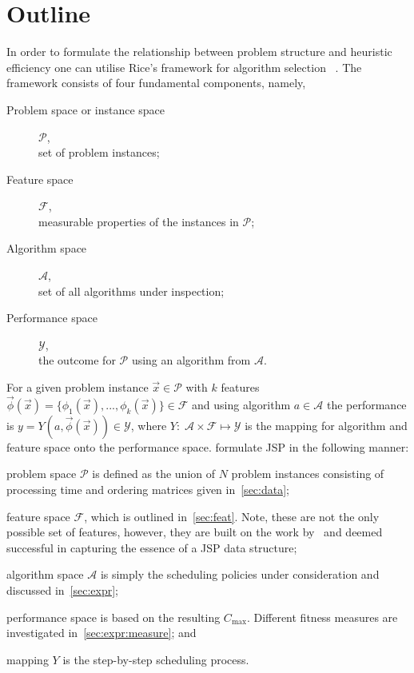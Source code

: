\documentclass{acm_proc_article-sp}
\begin{document}
\section{Outline}
In order to formulate the relationship between problem structure and heuristic efficiency one can utilise Rice's framework for algorithm selection ~\cite{Rice76}. The framework consists of four fundamental components, namely,
\begin{description}
  \item[Problem space or instance space] $\mathcal{P}$, \hfill\\
  set of problem instances; 
  \item[Feature space] $\mathcal{F}$, \hfill\\
  measurable properties of the instances in $\mathcal{P}$;
  \item[Algorithm space] $\mathcal{A}$, \hfill\\
  set of all algorithms under inspection;
  \item[Performance space] $\mathcal{Y}$, \hfill\\
  the outcome for $\mathcal{P}$ using an algorithm from $\mathcal{A}$.
\end{description}
For a given problem instance $\vec{x}\in\mathcal{P}$ with $k$ features $\vec{\phi}(\vec{x})=\{\phi_1(\vec{x}),...,\phi_k( \vec{x})\}\in\mathcal{F}$ and using algorithm $a\in\mathcal{A}$ the performance is $y=Y(a,\vec{\phi}(\vec{x}))\in\mathcal{Y}$, where $Y:\;\mathcal{A}\times\mathcal{F} \mapsto \mathcal{Y}$ is the mapping for algorithm and feature space onto the performance space. 
\cite{SmithMilesLion3,SmithMilesLion5,InRu12} formulate JSP in the following manner: 
\begin{inparaenum} 
\item problem space $\mathcal{P}$ is defined as the union of $N$ problem instances consisting of processing time and ordering matrices given in~\cref{sec:data}; 
\item feature space $\mathcal{F}$, which is outlined in~\cref{sec:feat}. Note, these are not the only possible set of features, however, they are built on the work by~\cite{InRu11a,SmithMilesLion3} and deemed successful in capturing the essence of a JSP data structure;
\item algorithm space $\mathcal{A}$ is simply the scheduling policies under consideration and discussed in~\cref{sec:expr};
\item performance space is based on the resulting $C_{\max}$. Different fitness measures are investigated in~\cref{sec:expr:measure};
and \item mapping $Y$ is the step-by-step scheduling process. 
\end{inparaenum}
\end{document}
